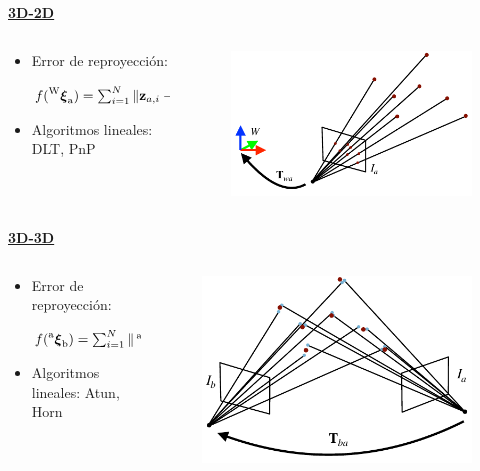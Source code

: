 \begin{frame}
    \underline{\textbf{3D-2D}}
    \begin{columns}
    \begin{column}{0.7\textwidth}
        \begin{itemize}
            \item Error de reproyección:
            \begin{center}
                $f(\prescript{\mathrm{\mathrm{W}}}{}{{\boldsymbol{\mathbf{\xi}}}_\mathrm{a}})= \sum_{i=1}^{N} \Vert \boldsymbol{\mathbf{z}}_{a,i} - \hat{\boldsymbol{\mathbf{z}}}({\prescript{\mathrm{\mathrm{W}}}{}{{\boldsymbol{\mathbf{\xi}}}_\mathrm{a}}}^{-1},\prescript{\mathrm{\mathrm{W}}}{}{\boldsymbol{\mathbf{p}}}_{i}) \Vert^{2}$
            \end{center}
            \item Algoritmos lineales: DLT, PnP
        \end{itemize}
    \end{column}
    \begin{column}{0.3\textwidth}
        \begin{figure}
            \includegraphics[width=0.5\columnwidth]{./images/localization_3d_2d.pdf}
        \end{figure}
    \end{column}
    \end{columns}
    \underline{\textbf{3D-3D}}
    \begin{columns}
        \begin{column}{0.7\textwidth}
            \begin{itemize}
                \item Error de reproyección:
                \begin{center}
                    $f(\prescript{\mathrm{a}}{}{{\boldsymbol{\mathbf{\xi}}}_\mathrm{b}})= \sum_{i=1}^{N} \Vert \prescript{\mathrm{a}}{}{\boldsymbol{\mathbf{p}}}_{i} - \prescript{\mathrm{a}}{}{{\boldsymbol{\mathbf{\xi}}}_\mathrm{b}} \prescript{\mathrm{b}}{}{\boldsymbol{\mathbf{p}}}_{i} \Vert^{2}$
                \end{center}
                \item Algoritmos lineales: Atun, Horn
            \end{itemize}
        \end{column}
        \begin{column}{0.3\textwidth}
            \begin{figure}
                \includegraphics[width=0.4\columnwidth]{./images/localization_3d_3d.pdf}
            \end{figure}
        \end{column}
    \end{columns}


\end{frame}
